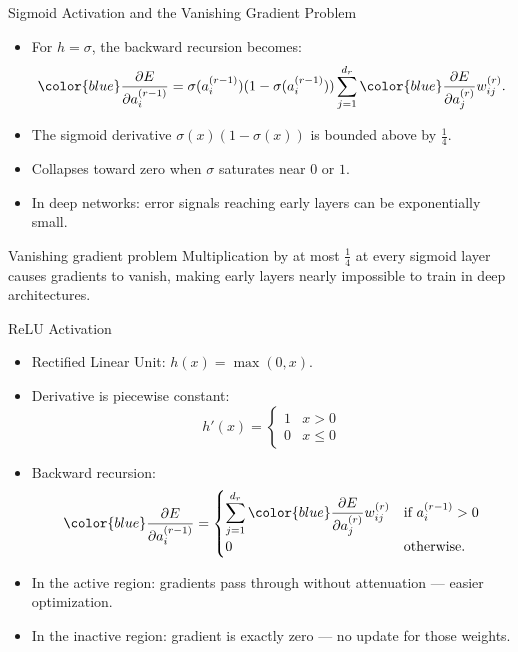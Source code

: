 \begin{frame}{Sigmoid Activation and the Vanishing Gradient Problem}
  \begin{itemize}
    \item For $h=\sigma$, the backward recursion becomes:
    \[
      {\color{blue}\frac{\partial E}{\partial a_i^{(r-1)}}}
      = \sigma(a_i^{(r-1)})(1-\sigma(a_i^{(r-1)})) \sum_{j=1}^{d_r} {\color{blue}\frac{\partial E}{\partial a_j^{(r)}}} w_{ij}^{(r)}.
    \]
    \item The sigmoid derivative $\sigma(x)(1-\sigma(x))$ is bounded above by $\tfrac{1}{4}$.
    \item Collapses toward \alert{zero when $\sigma$ saturates} near $0$ or $1$.
    \item In deep networks: error signals reaching early layers can be \alert{exponentially small}.
  \end{itemize}
  \begin{alertblock}{Vanishing gradient problem}
    Multiplication by at most $\frac{1}{4}$ at every sigmoid layer causes gradients to vanish, making
    early layers nearly \alert{impossible to train} in deep architectures.
  \end{alertblock}
\end{frame}

\begin{frame}{ReLU Activation}
  \begin{itemize}
    \item Rectified Linear Unit: $h(x) = \max(0, x)$.
    \item Derivative is piecewise constant:
    \[
      h'(x) = \begin{cases} 1 & x > 0 \\ 0 & x \le 0 \end{cases}
    \]
    \item Backward recursion:
    \[
      {\color{blue}\frac{\partial E}{\partial a_i^{(r-1)}}}
      = \begin{cases}
        \displaystyle\sum_{j=1}^{d_r}{\color{blue}\frac{\partial E}{\partial a_j^{(r)}}}w_{ij}^{(r)} & \text{if } a_i^{(r-1)}>0\\[1.5ex]
        0 & \text{otherwise.}
      \end{cases}
    \]
  \end{itemize}
  \begin{itemize}
    \item In the \alert{active region}: gradients pass through without attenuation — easier optimization.
    \item In the \alert{inactive region}: gradient is exactly zero — no update for those weights.
  \end{itemize}
\end{frame}

